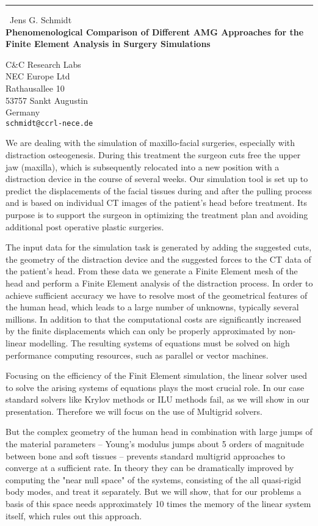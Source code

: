 \documentclass{report}
\begin{document}
\begin{center}
\rule{6in}{1pt} \
{\large Jens G. Schmidt \\
{\bf Phenomenological Comparison of Different AMG Approaches for the Finite Element Analysis in Surgery Simulations}}

C&C Research Labs \\ NEC Europe Ltd \\ Rathausallee 10 \\ 53757 Sankt Augustin \\ Germany
\\
{\tt schmidt@ccrl-nece.de}\end{center}

We are dealing with the simulation of maxillo-facial surgeries,
especially with distraction osteogenesis. During this treatment the
surgeon cuts free the upper jaw (maxilla), which is subsequently
relocated into a new position with a distraction device in the course of
several weeks. Our simulation tool is set up to predict the displacements
of the facial tissues during and after the pulling process and is based
on individual CT images of the patient's head before treatment. Its
purpose is to support the surgeon in optimizing the treatment plan and
avoiding additional post operative plastic surgeries.

The input data for the simulation task is generated by adding the
suggested cuts, the geometry of the distraction device and the suggested
forces to the CT data of the patient's head. From these data we generate
a Finite Element mesh of the head and perform a Finite Element analysis
of the distraction process. In order to achieve sufficient accuracy we
have to resolve most of the geometrical features of the human head, which
leads to a large number of unknowns, typically several millions. In
addition to that the computational costs are significantly increased by
the finite displacements which can only be properly approximated by
non-linear modelling. The resulting systems of equations must be solved
on high performance computing resources, such as parallel or vector
machines.

Focusing on the efficiency of the Finit Element simulation, the linear
solver used to solve the arising systems of equations plays the most
crucial role. In our case standard solvers like Krylov methods or ILU
methods fail, as we will show in our presentation. Therefore we will
focus on the use of Multigrid solvers.

But the complex geometry of the human head in combination with large
jumps of the material parameters -- Young's modulus jumps about 5 orders
of magnitude between bone and soft tissues -- prevents standard multigrid
approaches to converge at a sufficient rate. In theory they can be
dramatically improved by computing the "near null space" of the systems,
consisting of the all quasi-rigid body modes, and treat it separately.
But we will show, that for our problems a basis of this space needs
approximately 10 times the memory of the linear system itself, which
rules out this approach.
\end{document}
